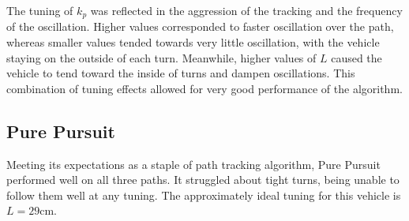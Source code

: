 \documentclass[mla8alt]{mla}
\begin{document}
\begin{paper}
\begin{figure}[H]
\endminipage
\end{figure}

The tuning of $k_p$ was reflected in the aggression of the tracking and the frequency of the oscillation. Higher values corresponded to faster oscillation over the path, whereas smaller values tended towards very little oscillation, with the vehicle staying on the outside of each turn. Meanwhile, higher values of $L$ caused the vehicle to tend toward the inside of turns and dampen oscillations. This combination of tuning effects allowed for very good performance of the algorithm.

\subsection{Pure Pursuit}

Meeting its expectations as a staple of path tracking algorithm, Pure Pursuit performed well on all three paths. It struggled about tight turns, being unable to follow them well at any tuning. The approximately ideal tuning for this vehicle is $L=29$cm.


\end{paper}
\end{document}
